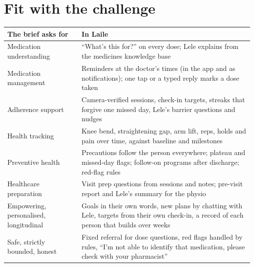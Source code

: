 \documentclass[11pt,a4paper]{article}
\begin{document}
\section{Fit with the challenge}\label{sec:fit}
\begin{tabularx}{\linewidth}{@{}L{3.6cm}Y@{}}
\toprule
\textbf{The brief asks for} & \textbf{In Laile}\\
\midrule
Medication understanding & ``What's this for?'' on every dose; Lele explains from the medicines knowledge base\\
Medication management & Reminders at the doctor's times (in the app and as notifications); one tap or a typed reply marks a dose taken\\
Adherence support & Camera-verified sessions, check-in targets, streaks that forgive one missed day, Lele's barrier questions and nudges\\
Health tracking & Knee bend, straightening gap, arm lift, reps, holds and pain over time, against baseline and milestones\\
Preventive health & Precautions follow the person everywhere; plateau and missed-day flags; follow-on programs after discharge; red-flag rules\\
Healthcare preparation & Visit prep questions from sessions and notes; pre-visit report and Lele's summary for the physio\\
Empowering, personalised, longitudinal & Goals in their own words, new plans by chatting with Lele, targets from their own check-in, a record of each person that builds over weeks\\
Safe, strictly bounded, honest & Fixed referral for dose questions, red flags handled by rules, ``I'm not able to identify that medication, please check with your pharmacist''\\
\bottomrule
\end{tabularx}
\end{document}
